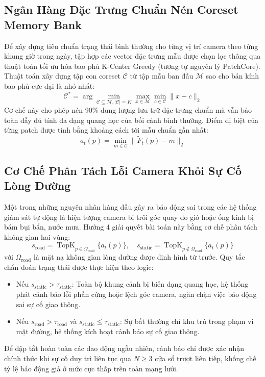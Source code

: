 \documentclass[11pt,a4paper]{article}
\begin{document}
\subsection{Ngân Hàng Đặc Trưng Chuẩn Nén Coreset Memory Bank}
Để xây dựng tiêu chuẩn trạng thái bình thường cho từng vị trí camera theo từng khung giờ trong ngày, tập hợp các vector đặc trưng mẫu được chọn lọc thông qua thuật toán tối ưu hóa bao phủ K-Center Greedy (tương tự nguyên lý PatchCore). Thuật toán xây dựng tập con coreset $\mathcal{C}$ từ tập mẫu ban đầu $\mathcal{M}$ sao cho bán kính bao phủ cực đại là nhỏ nhất:
\begin{equation}
    \mathcal{C}^* = \arg\min_{\mathcal{C} \subseteq \mathcal{M}, |\mathcal{C}| = K} \max_{x \in \mathcal{M}} \min_{c \in \mathcal{C}} \|x - c\|_2
\end{equation}
Cơ chế này cho phép nén 90\% dung lượng lưu trữ đặc trưng chuẩn mà vẫn bảo toàn đầy đủ tính đa dạng quang học của bối cảnh bình thường. Điểm dị biệt của từng patch được tính bằng khoảng cách tới mẫu chuẩn gần nhất:
\begin{equation}
    a_t(p) = \min_{m \in \mathcal{C}} \|\tilde{F}_t(p) - m\|_2
\end{equation}

\subsection{Cơ Chế Phân Tách Lỗi Camera Khỏi Sự Cố Lòng Đường}
Một trong những nguyên nhân hàng đầu gây ra báo động sai trong các hệ thống giám sát tự động là hiện tượng camera bị trôi góc quay do gió hoặc ống kính bị bám bụi bẩn, nước mưa. Hướng 4 giải quyết bài toán này bằng cơ chế phân tách không gian hai vùng:
\begin{equation}
    s_{\text{road}} = \operatorname{TopK}_{p \in \Omega_{\text{road}}}\{a_t(p)\}, \quad s_{\text{static}} = \operatorname{TopK}_{p \notin \Omega_{\text{road}}}\{a_t(p)\}
\end{equation}
với $\Omega_{\text{road}}$ là mặt nạ không gian lòng đường được định hình từ trước. Quy tắc chẩn đoán trạng thái được thực hiện theo logic:
\begin{itemize}
    \item Nếu $s_{\text{static}} > \tau_{\text{static}}$: Toàn bộ khung cảnh bị biến dạng quang học, hệ thống phát cảnh báo lỗi phần cứng hoặc lệch góc camera, ngăn chặn việc báo động sai sự cố giao thông.
    \item Nếu $s_{\text{road}} > \tau_{\text{road}}$ và $s_{\text{static}} \le \tau_{\text{static}}$: Sự bất thường chỉ khu trú trong phạm vi mặt đường, hệ thống kích hoạt cảnh báo sự cố giao thông.
\end{itemize}
Để dập tắt hoàn toàn các dao động ngẫu nhiên, cảnh báo chỉ được xác nhận chính thức khi sự cố duy trì liên tục qua $N \ge 3$ cửa sổ trượt liên tiếp, khống chế tỷ lệ báo động giả ở mức cực thấp trên toàn mạng lưới.
\end{document}
